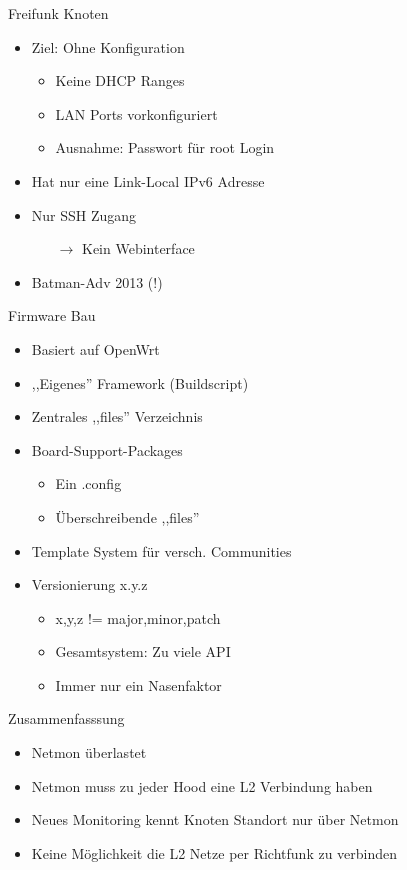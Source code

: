 \begin{frame}{Freifunk Knoten}
    \begin{itemize}
        \item Ziel: Ohne Konfiguration
        \begin{itemize}
            \item Keine DHCP Ranges
            \item LAN Ports vorkonfiguriert
            \item Ausnahme: Passwort für root Login
        \end{itemize}
        \item Hat nur eine Link-Local IPv6 Adresse
        \item Nur SSH Zugang
        \begin{itemize}
            \item[$\rightarrow$] Kein Webinterface
        \end{itemize}
        \item Batman-Adv 2013 (!)
    \end{itemize}
\end{frame}

\begin{frame}{Firmware Bau}
    \begin{itemize}
        \item Basiert auf OpenWrt
        \item ,,Eigenes'' Framework (Buildscript)
        \item Zentrales ,,files'' Verzeichnis
        \item Board-Support-Packages
        \begin{itemize}
            \item Ein .config
            \item Überschreibende ,,files''
        \end{itemize}
        \item Template System für versch. Communities
        \item Versionierung x.y.z
        \begin{itemize}
            \item x,y,z != major,minor,patch
            \item Gesamtsystem: Zu viele API
            \item Immer nur ein Nasenfaktor
        \end{itemize}
    \end{itemize}
\end{frame}

\begin{frame}{Zusammenfasssung}
    \begin{itemize}
        \item Netmon überlastet
        \item Netmon muss zu jeder Hood eine L2 Verbindung haben
        \item Neues Monitoring kennt Knoten Standort nur über Netmon
        \item Keine Möglichkeit die L2 Netze per Richtfunk zu verbinden
    \end{itemize}
\end{frame}
